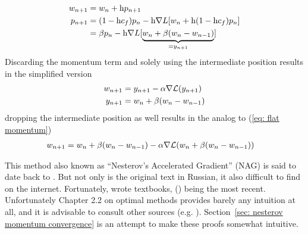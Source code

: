 \begin{definition}
	\label{def: nesterov's momentum}
	\begin{subequations}
	\begin{align}
		w_{n+1} &= w_n + \text{h} p_{n+1} \label{eq: nesterov momentum move}\\
		p_{n+1}
		&= (1-\text{h}c_f)p_n
		- \text{h}\nabla L[w_n + \text{h}(1-\text{h}c_f)p_n]
		\label{eq: nesterov momentum}
		\\ \nonumber
		&= \beta p_n
		- \text{h}\nabla L[\underbrace{
			w_n + \beta(w_n - w_{n-1})
		}_{= y_{n+1}}]
	\end{align}
	\end{subequations}
	Discarding the momentum term and solely using the intermediate position
	results in the simplified version
	\begin{subequations} \label{eq: nesterov intermediate position version}
	\begin{align}
		w_{n+1} &= y_{n+1} - \alpha \nabla \mathcal{L}(y_{n+1})\\
		y_{n+1}&= w_n + \beta(w_n - w_{n-1})
	\end{align}
	\end{subequations}
	dropping the intermediate position as well results in the analog to (\ref{eq:
	flat momentum})
	\begin{align}
		w_{n+1} &= w_n + \beta(w_n - w_{n-1})
		- \alpha \nabla \mathcal{L}(w_n + \beta(w_n - w_{n-1}))
	\end{align}
\end{definition}
%
\begin{remark}
	This method also known as ``Nesterov's Accelerated Gradient'' (NAG) is said
	to date back to \textcite{nesterovMethodSolvingConvex1983}.  But not only is
	the original text in Russian, it also difficult to find on the internet.
	Fortunately, \citeauthor{nesterovMethodSolvingConvex1983} wrote textbooks,
	(\citeyear{nesterovLecturesConvexOptimization2018}) being the most recent.
	Unfortunately Chapter 2.2 on optimal methods provides barely any
	intuition at all, and it is advisable to consult other sources (e.g.
	\textcite{dontlooWhatDifferenceMomentum2016}). Section~\ref{sec: nesterov
	momentum convergence} is an attempt to make these proofs somewhat intuitive.
 \end{remark}

